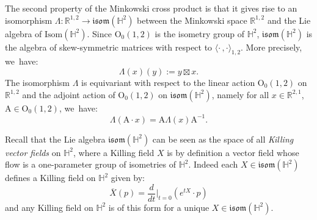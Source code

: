 \documentclass[JEP,XML,SOM,Unicode,NoEqCountersInSection, NoFloatCountersInSection,published]{cedram}
\theoremstyle{plain}
\theoremstyle{definition}
\newcommand{\minko}{\mathbb{R}^{1,2}}
\newcommand{\inner}[1] {\langle #1 \rangle}
\begin{document}
The second property of the Minkowski cross product is that it gives rise to an isomorphism $\Lambda: \mathbb{R}^{1,2}\to \mathfrak{isom}(\mathbb{H}^2)$ between the Minkowski space $\minko$ and the Lie algebra of $\mathrm{Isom}(\mathbb{H}^2)$. Since $\mathrm{O}_0(1,2)$ is the isometry group of $\mathbb{H}^2$, $\mathfrak{isom}(\mathbb{H}^2)$ is the algebra of skew-symmetric matrices with respect to $\inner{\cdot\,,\cdot}_{1,2}$. More precisely, we~have:\vspace*{-3pt}
\begin{equation}\label{lievskilling}
\Lambda(x)(y):=y\boxtimes x.
\end{equation}
The isomorphism $\Lambda$ is equivariant with respect to the linear action $\mathrm{O}_0(1,2)$ on $\minko$ and the adjoint action of $\mathrm{O}_0(1,2)$ on $\mathfrak{isom}(\mathbb{H}^2)$, namely for all $x\in \mathbb{R}^{2,1}$, $\mathrm{A}\in\mathrm{O}_0(1,2)$, we~have:\vspace*{-3pt}
\begin{equation}\label{adequivariance}
\Lambda(\mathrm{A}\cdot x)=\mathrm{A}\Lambda(x)\mathrm{A}^{-1}.
\end{equation}

Recall that the Lie algebra $\mathfrak{isom}(\mathbb{H}^2)$ can be seen as the space of all \emph{Killing vector fields} on $\mathbb{H}^2$, where a Killing field $X$ is by definition a vector field whose flow is a one-parameter group of isometries of $\mathbb{H}^2$. Indeed each $X\in \mathfrak{isom}(\mathbb{H}^2)$ defines a Killing field on $\mathbb{H}^2$ given by:
\[
\overline{X}(p)=\frac{d}{dt}\Big\lvert_{t=0} (e^{tX}\cdot p)
\]
and any Killing field on $\mathbb{H}^2$ is of this form for a unique $X \in \mathfrak{isom}(\mathbb{H}^2)$.
\end{document}

